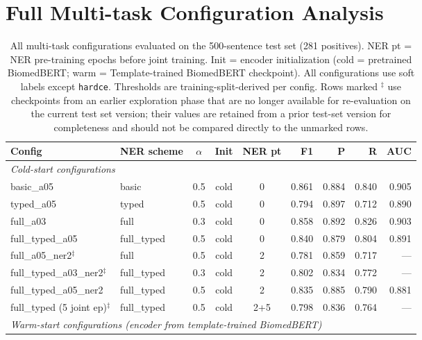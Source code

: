 \documentclass[11pt,twocolumn]{article}
\begin{document}
\section{Full Multi-task Configuration Analysis}
\label{app:fullablation}

\begin{table}[H]
\centering
\small
\caption{All multi-task configurations evaluated on the 500-sentence test set
(281 positives). NER pt = NER pre-training epochs before joint training.
Init = encoder initialization (cold = pretrained BiomedBERT; warm = Template-trained BiomedBERT checkpoint).
All configurations use soft labels except \texttt{hardce}.
Thresholds are training-split-derived per config. Rows marked $^{\ddagger}$ use
checkpoints from an earlier exploration phase that are no longer available
for re-evaluation on the current test set version; their values are
retained from a prior test-set version for completeness and should not be
compared directly to the unmarked rows.}
\label{tab:ablation_full}
\begin{tabular}{llcccrrrr}
\toprule
\textbf{Config} & \textbf{NER scheme} & $\alpha$ & \textbf{Init} & \textbf{NER pt} &
\textbf{F1} & \textbf{P} & \textbf{R} & \textbf{AUC} \\
\midrule
\multicolumn{9}{l}{\textit{Cold-start configurations}} \\
\midrule
basic\_a05                          & basic       & 0.5 & cold & 0 & 0.861 & 0.884 & 0.840 & 0.905 \\
typed\_a05                          & typed       & 0.5 & cold & 0 & 0.794 & 0.897 & 0.712 & 0.890 \\
full\_a03                           & full        & 0.3 & cold & 0 & 0.858 & 0.892 & 0.826 & 0.903 \\
full\_typed\_a05                    & full\_typed & 0.5 & cold & 0 & 0.840 & 0.879 & 0.804 & 0.891 \\
full\_a05\_ner2$^{\ddagger}$        & full        & 0.5 & cold & 2 & 0.781 & 0.859 & 0.717 & --- \\
full\_typed\_a03\_ner2$^{\ddagger}$ & full\_typed & 0.3 & cold & 2 & 0.802 & 0.834 & 0.772 & --- \\
full\_typed\_a05\_ner2 & full\_typed & 0.5 & cold & 2 & 0.835 & 0.885 & 0.790 & 0.881 \\
full\_typed (5 joint ep)$^{\ddagger}$ & full\_typed & 0.5 & cold & 2+5 & 0.798 & 0.836 & 0.764 & --- \\
\midrule
\multicolumn{9}{l}{\textit{Warm-start configurations (encoder from template-trained BiomedBERT)}} \\

\end{tabular}
\end{table}
\end{document}

